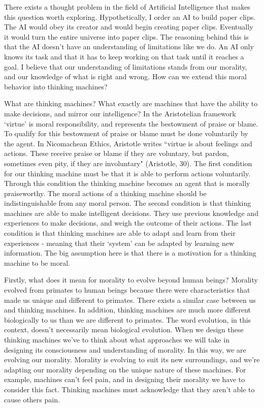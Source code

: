 \documentclass[11pt, oneside]{article}
\begin{document}
\par There exists a thought problem in the field of Artificial Intelligence that makes this question worth exploring. Hypothetically, I order an AI to build paper clips. The AI would obey its creator and would begin creating paper clips. Eventually it would turn the entire universe into paper clips. The reasoning behind this is that the AI doesn't have an understanding of limitations like we do. An AI only knows its task and that it has to keep working on that task until it reaches a goal. I believe that our understanding of limitations stands from our morality, and our knowledge of what is right and wrong. How can we extend this moral behavior into thinking machines?

\par What are thinking machines? What exactly are machines that have the ability to make decisions, and mirror our intelligence? In the Aristotelian framework `virtue' is moral responsibility, and represents the bestowment of praise or blame. To qualify for this bestowment of praise or blame must be done voluntarily by the agent. In Nicomachean Ethics, Aristotle writes ``virtue is about feelings and actions. These receive praise or blame if they are voluntary, but pardon, sometimes even pity, if they are involuntary" (Aristotle, 30). The first condition for our thinking machine must be that it is able to perform actions voluntarily. Through this condition the thinking machine becomes an agent that is morally praiseworthy. The moral actions of a thinking machine should be indistinguishable from any moral person. The second condition is that thinking machines are able to make intelligent decisions. They use previous knowledge and experiences to make decisions, and weigh the outcome of their actions. The last condition is that thinking machines are able to adapt and learn from their experiences - meaning that their `system' can be adapted by learning new information. The big assumption here is that there is a motivation for a thinking machine to be moral. 

\par Firstly, what does it mean for morality to evolve beyond human beings? Morality evolved from primates to human beings because there were characteristics that made us unique and different to primates. There exists a similar case between us and thinking machines. In addition, thinking machines are much more different biologically to us than we are different to primates. The word evolution, in this context, doesn't necessarily mean biological evolution. When we design these thinking machines we've to think about what approaches we will take in designing its consciousness and understanding of morality. In this way, we are evolving our morality. Morality is evolving to suit its new surroundings, and we're adapting our morality depending on the unique nature of these machines. For example, machines can't feel pain, and in designing their morality we have to consider this fact. Thinking machines must acknowledge that they aren't able to cause others pain.
\end{document}

